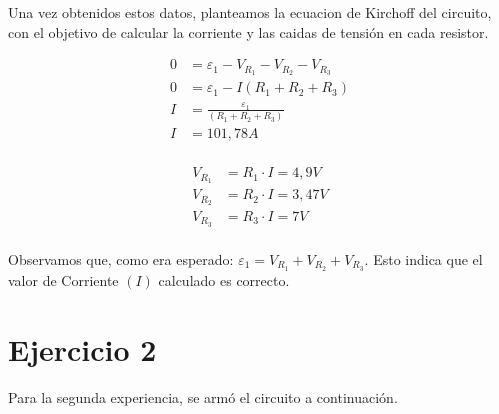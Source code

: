 \documentclass[12pt]{report}
\begin{document}
Una vez obtenidos estos datos, planteamos la ecuacion de Kirchoff del circuito,
con el objetivo de calcular la corriente y las caidas de tensión en cada resistor.

\begin{minipage}[t]{0.48\textwidth}
  $$
  \begin{aligned}
    0 &= \varepsilon_1 - V_{R_1} - V_{R_2} - V_{R_3}\\[6pt]
    0 &= \varepsilon_1 - I (R_1 + R_2 + R_3)\\[6pt]
    I &= \frac{\varepsilon_1}{(R_1 + R_2 + R_3)}\\[6pt]
    I &= 101,78A\\[6pt]
  \end{aligned}
  $$
\end{minipage}
\hfill
\begin{minipage}[t]{0.48\textwidth}
  \vspace{7mm}
  $$
  \begin{aligned}
    V_{R_1} &= R_1 \cdot I = 4,9 V\\[6pt]
    V_{R_2} &= R_2 \cdot I = 3,47 V\\[6pt]
    V_{R_3} &= R_3 \cdot I = 7 V\\[6pt]
  \end{aligned}
  $$
\end{minipage}

Observamos que, como era esperado: $\varepsilon_1 =  V_{R_1} + V_{R_2} + V_{R_3}$. Esto 
indica que el valor de Corriente $(I)$ calculado es correcto.

%
%
%
%

\chapter{Ejercicio 2}
Para la segunda experiencia, se armó el circuito a continuación.
\end{document}
